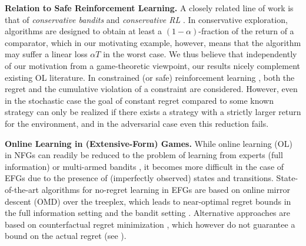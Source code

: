\noindent\textbf{Relation to Safe Reinforcement Learning.} A closely related line of work is that of \emph{conservative bandits} \citep{wu2016conservative} and \emph{conservative RL} \citep{garcelon2020conservative}. In conservative exploration, algorithms are designed to obtain at least a $(1-\alpha)$-fraction of the return of a comparator, which in our motivating example, however, means that the algorithm may suffer a linear loss $\alpha T$ in the worst case. We thus believe that independently of our motivation from a game-theoretic viewpoint, our results nicely complement existing OL literature. In constrained (or safe) reinforcement learning \citep{badanidiyuru2018bandits,efroni2020exploration}, both the regret and the cumulative violation of a constraint are considered. However, even in the stochastic case the goal of constant regret compared to some known strategy can only be realized if there exists a strategy with a strictly larger return \citep{liu2021learning} for the environment, and in the adversarial case even this reduction fails.

\textbf{Online Learning in (Extensive-Form) Games.} While online learning (OL) in NFGs can readily be reduced to the problem of learning from experts \citep{cesa2006prediction} (full information) or multi-armed bandits \citep{lattimore2020bandit}, it becomes more difficult in the case of EFGs \citep{osborne1994course} due to the presence of (imperfectly observed) states and transitions. State-of-the-art algorithms for no-regret learning in EFGs are based on online mirror descent (OMD) over the treeplex, which leads to near-optimal regret bounds in the full information setting \citep{farina2021bandit,fan2024optimality} and the bandit setting \citep{farina2021bandit,kozuno2021model,bai2022near,fiegel2023adapting}. Alternative approaches are based on counterfactual regret minimization \citep{zinkevich2007regret,lanctot2009monte}, which however do not guarantee a bound on the actual regret (see \citet[Theorem 7]{bai2022near}).